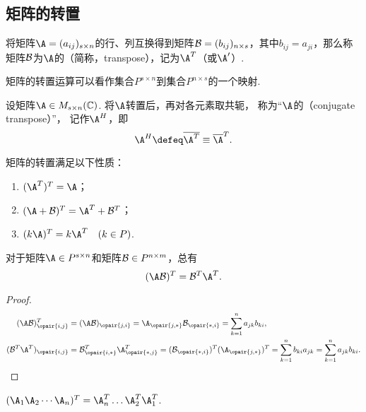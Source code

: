 \subsection{矩阵的转置}
\begin{definition}[矩阵的转置]
将矩阵\(\A=(a_{ij})_{s \times n}\)的行、列互换得到矩阵\(\mathcal{B}=(b_{ij})_{n \times s}\)，其中\(b_{ij} = a_{ji}\)，那么称矩阵\(\mathcal{B}\)为\(\A\)的（简称，transpose），记为\(\A^T\)（或\(\A'\)）.
\end{definition}
矩阵的转置运算可以看作集合\(P^{s \times n}\)到集合\(P^{n \times s}\)的一个映射.

\begin{definition}[矩阵的共轭转置]
设矩阵\(\A \in M_{s \times n}(\mathbb{C})\).
将\(\A\)转置后，再对各元素取共轭，
称为“\(\A\)的（conjugate transpose）”，
记作\(\A^H\)，即\[
    \A^H \defeq \overline{\A^T} \equiv \overline{\A}^T.
\]
\end{definition}

\begin{property}
矩阵的转置满足以下性质：
\begin{enumerate}
\item \((\A^T)^T = \A\)；
\item \((\A+\B)^T = \A^T + \B^T\)；
\item \((k\A)^T = k\A^T \quad(k \in P)\).
\end{enumerate}
\end{property}

\begin{theorem}\label{theorem:矩阵.矩阵乘积的转置}
对于矩阵\(\A \in P^{s \times n}\)和矩阵\(\mathcal{B} \in P^{n \times m}\)，总有\[
(\A\B)^T = \B^T \A^T.
\]
\begin{proof}
\begin{align*}
(\A \B)^T_{\opair{i,j}}
&= (\A \B)_{\opair{j,i}}
= \A_{\opair{j,*}} \B_{\opair{*,i}}
= \sum\limits_{k=1}^n a_{jk} b_{ki}, \\
(\B^T \A^T)_{\opair{i,j}}
&= \B^T_{\opair{i,*}} \A^T_{\opair{*,j}}
= (\B_{\opair{*,i}})^T (\A_{\opair{j,*}})^T
= \sum\limits_{k=1}^n b_{ki} a_{jk}
= \sum\limits_{k=1}^n a_{jk} b_{ki}.
\qedhere
\end{align*}
\end{proof}
\end{theorem}

\begin{corollary}
\((\A_1 \A_2 \dotsb \A_n)^T = \A_n^T \dots \A_2^T \A_1^T\).
\end{corollary}

